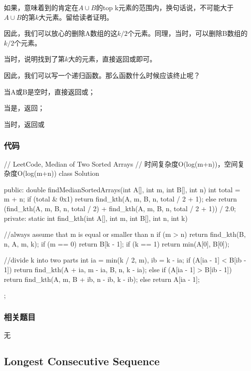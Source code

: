 如果，意味着到\fn{A[k/2-1}的肯定在$A \cup B$的top 
k元素的范围内，换句话说，\fn{A[k/2-1}不可能大于$A \cup B$的第$k$大元素。留给读者证明。

因此，我们可以放心的删除A数组的这$k/2$个元素。同理，当时，可以删除B数组的$k/2$个元素。

当时，说明找到了第$k$大的元素，直接返回或即可。

因此，我们可以写一个递归函数。那么函数什么时候应该终止呢？
\begindot
\item 当A或B是空时，直接返回或；
\item 当是，返回；
\item 当时，返回或
\myenddot


\subsubsection{代码}
\begin{Code}
	// LeetCode, Median of Two Sorted Arrays
	// 时间复杂度O(log(m+n))，空间复杂度O(log(m+n))
	class Solution {
		public:
		double findMedianSortedArrays(int A[], int m, int B[], int n) {
			int total = m + n;
			if (total & 0x1)
			return find_kth(A, m, B, n, total / 2 + 1);
			else
			return (find_kth(A, m, B, n, total / 2)
			+ find_kth(A, m, B, n, total / 2 + 1)) / 2.0;
		}
		private:
		static int find_kth(int A[], int m, int B[], int n, int k) {
			//always assume that m is equal or smaller than n
			if (m > n) return find_kth(B, n, A, m, k);
			if (m == 0) return B[k - 1];
			if (k == 1) return min(A[0], B[0]);
			
			//divide k into two parts
			int ia = min(k / 2, m), ib = k - ia;
			if (A[ia - 1] < B[ib - 1])
			return find_kth(A + ia, m - ia, B, n, k - ia);
			else if (A[ia - 1] > B[ib - 1])
			return find_kth(A, m, B + ib, n - ib, k - ib);
			else
			return A[ia - 1];
		}
	};
\end{Code}


\subsubsection{相关题目}

\begindot
\item 无
\myenddot


\subsection{Longest Consecutive Sequence} %
\label{sec:longest-consecutive-sequence}


